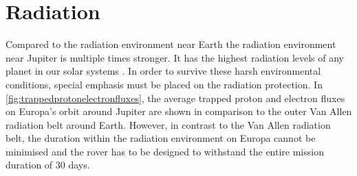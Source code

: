 \clearpage

\section{Radiation}
\label{sec:Radiation}

Compared to the radiation environment near Earth the radiation environment near Jupiter is multiple times stronger. It has the highest radiation levels of any planet in our solar systems \cite{Platzhalter}. In order to survive these harsh environmental conditions, special emphasis must be placed on the radiation protection. In \autoref{fig:trappedprotonelectronfluxes}, the average trapped proton and electron fluxes on Europa's orbit around Jupiter are shown in comparison to the outer Van Allen radiation belt around Earth. However, in contrast to the Van Allen radiation belt, the duration within the radiation environment on Europa cannot be minimised and the rover has to be designed to withstand the entire mission duration of 30 days.

